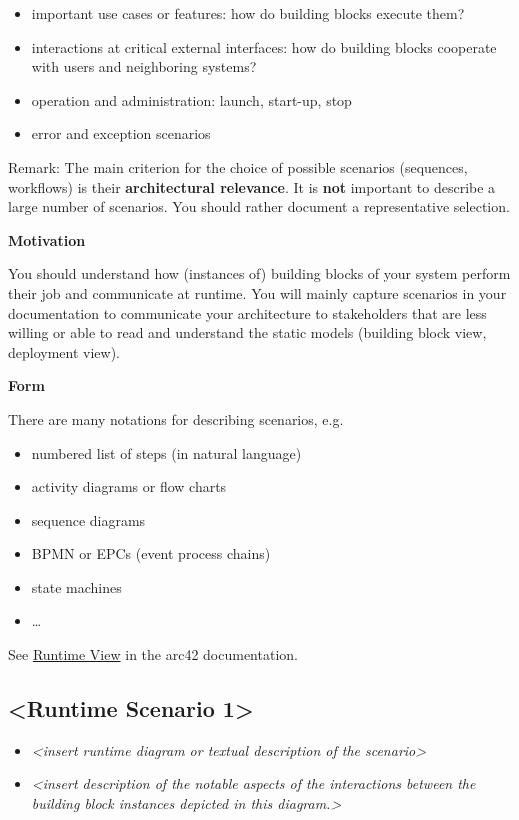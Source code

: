 \documentclass[
]{article}
\begin{document}
\begin{itemize}
\item
  important use cases or features: how do building blocks execute them?
\item
  interactions at critical external interfaces: how do building blocks
  cooperate with users and neighboring systems?
\item
  operation and administration: launch, start-up, stop
\item
  error and exception scenarios
\end{itemize}

Remark: The main criterion for the choice of possible scenarios
(sequences, workflows) is their \textbf{architectural relevance}. It is
\textbf{not} important to describe a large number of scenarios. You
should rather document a representative selection.

\textbf{Motivation}

You should understand how (instances of) building blocks of your system
perform their job and communicate at runtime. You will mainly capture
scenarios in your documentation to communicate your architecture to
stakeholders that are less willing or able to read and understand the
static models (building block view, deployment view).

\textbf{Form}

There are many notations for describing scenarios, e.g.

\begin{itemize}
\item
  numbered list of steps (in natural language)
\item
  activity diagrams or flow charts
\item
  sequence diagrams
\item
  BPMN or EPCs (event process chains)
\item
  state machines
\item
  \ldots{}
\end{itemize}

See \href{https://docs.arc42.org/section-6/}{Runtime View} in the arc42
documentation.

\hypertarget{__runtime_scenario_1}{%
\subsection{\textless Runtime Scenario
1\textgreater{}}\label{__runtime_scenario_1}}

\begin{itemize}
\item
  \emph{\textless insert runtime diagram or textual description of the
  scenario\textgreater{}}
\item
  \emph{\textless insert description of the notable aspects of the
  interactions between the building block instances depicted in this
  diagram.\textgreater{}}
\end{itemize}
\end{document}
